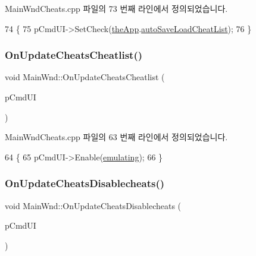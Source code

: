 Main\+Wnd\+Cheats.\+cpp 파일의 73 번째 라인에서 정의되었습니다.


\begin{DoxyCode}
74 \{
75   pCmdUI->SetCheck(\mbox{\hyperlink{_v_b_a_8cpp_a8095a9d06b37a7efe3723f3218ad8fb3}{theApp}}.\mbox{\hyperlink{class_v_b_a_a234d3693fb47b5ca956545eb7f9671fb}{autoSaveLoadCheatList}});
76 \}
\end{DoxyCode}
\mbox{\label{class_main_wnd_ae88de7e8f7d73a87e5f3bb1ffa28a792}} 
\subsubsection{\texorpdfstring{On\+Update\+Cheats\+Cheatlist()}{OnUpdateCheatsCheatlist()}}
{\footnotesize\ttfamily void Main\+Wnd\+::\+On\+Update\+Cheats\+Cheatlist (\begin{DoxyParamCaption}\item[{C\+Cmd\+UI $\ast$}]{p\+Cmd\+UI }\end{DoxyParamCaption})\hspace{0.3cm}{\ttfamily [protected]}}



Main\+Wnd\+Cheats.\+cpp 파일의 63 번째 라인에서 정의되었습니다.


\begin{DoxyCode}
64 \{
65   pCmdUI->Enable(\mbox{\hyperlink{_main_wnd_cheats_8cpp_af9cc36078b1b311753963297ae7f2a74}{emulating}});
66 \}
\end{DoxyCode}
\mbox{\label{class_main_wnd_a7eae676f3ed65c790243e6a051c554c0}} 
\subsubsection{\texorpdfstring{On\+Update\+Cheats\+Disablecheats()}{OnUpdateCheatsDisablecheats()}}
{\footnotesize\ttfamily void Main\+Wnd\+::\+On\+Update\+Cheats\+Disablecheats (\begin{DoxyParamCaption}\item[{C\+Cmd\+UI $\ast$}]{p\+Cmd\+UI }\end{DoxyParamCaption})\hspace{0.3cm}{\ttfamily [protected]}}



